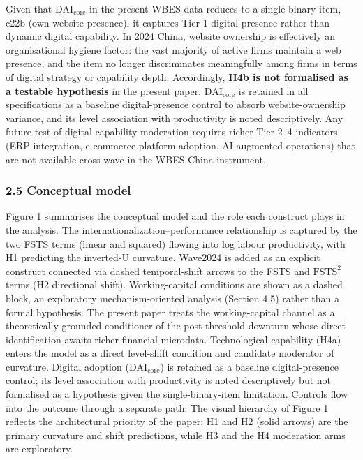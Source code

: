 \documentclass[12pt,a4paper]{article}
\begin{document}
Given that \(\mathrm{DAI}_{\text{core}}\) in the present WBES data
reduces to a single binary item, c22b (own-website presence), it
captures Tier-1 digital presence rather than dynamic digital capability.
In 2024 China, website ownership is effectively an organisational
hygiene factor: the vast majority of active firms maintain a web
presence, and the item no longer discriminates meaningfully among firms
in terms of digital strategy or capability depth. Accordingly,
\textbf{H4b is not formalised as a testable hypothesis} in the present
paper. \(\mathrm{DAI}_{\text{core}}\) is retained in all specifications
as a baseline digital-presence control to absorb website-ownership
variance, and its level association with productivity is noted
descriptively. Any future test of digital capability moderation requires
richer Tier 2--4 indicators (ERP integration, e-commerce platform
adoption, AI-augmented operations) that are not available cross-wave in
the WBES China instrument.

\hypertarget{25-conceptual-model}{%
\subsubsection{2.5 Conceptual model}\label{25-conceptual-model}}

Figure 1 summarises the conceptual model and the role each construct
plays in the analysis. The internationalization--performance
relationship is captured by the two FSTS terms (linear and squared)
flowing into log labour productivity, with H1 predicting the inverted‑U
curvature. Wave2024 is added as an explicit construct connected via
dashed temporal-shift arrows to the FSTS and \(\mathrm{FSTS}^2\) terms
(H2 directional shift). Working-capital conditions are shown as a dashed
block, an exploratory mechanism-oriented analysis (Section 4.5) rather
than a formal hypothesis. The present paper treats the working-capital
channel as a theoretically grounded conditioner of the post-threshold
downturn whose direct identification awaits richer financial microdata.
Technological capability (H4a) enters the model as a direct level‑shift
condition and candidate moderator of curvature. Digital adoption
(\(\mathrm{DAI}_{\text{core}}\)) is retained as a baseline
digital-presence control; its level association with productivity is
noted descriptively but not formalised as a hypothesis given the
single-binary-item limitation. Controls flow into the outcome through a
separate path. The visual hierarchy of Figure 1 reflects the
architectural priority of the paper: H1 and H2 (solid arrows) are the
primary curvature and shift predictions, while H3 and the H4 moderation
arms are exploratory.
\end{document}
